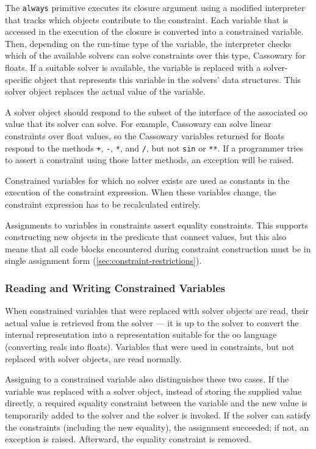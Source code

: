 The \lstinline{always} primitive executes its closure argument using a
modified interpreter that tracks which objects contribute to the
constraint. Each variable that is accessed in the execution of the
closure is converted into a constrained variable. Then, depending on
the run-time type of the variable, the interpreter checks which of the
available solvers can solve constraints over this type, \eg Cassowary
for floats. If a suitable solver is available, the variable is
replaced with a solver-specific object that represents this variable
in the solvers' data structures. This solver object replaces the
actual value of the variable.

A solver object should respond to the subset of the interface of the
associated \ac{oo} value that its solver can solve. For example,
Cassowary can solve linear constraints over float values, so the
Cassowary variables returned for floats respond to the methods
\lstinline{+}, \lstinline{-}, \lstinline{*}, and \lstinline{/}, but
not \lstinline{sin} or \lstinline{**}. If a programmer tries to assert
a constraint using those latter methods, an exception will be raised.

Constrained variables for which no solver exists are used as constants
in the execution of the constraint expression. When these variables
change, the constraint expression has to be recalculated entirely.

Assignments to variables in constraints assert equality
constraints. This supports constructing new objects in
the predicate that connect values, but this also means that all
code blocks encountered during constraint construction must be in
single assignment form (\autoref{sec:constraint-restrictions}).

\subsubsection{Reading and Writing Constrained Variables}
When constrained variables that were replaced with solver objects are
read, their actual value is retrieved from the solver --- it is up to
the solver to convert the internal representation into a
representation suitable for the \ac{oo} language (\eg converting
reals into floats). Variables that were used in constraints, but not
replaced with solver objects, are read normally.

Assigning to a constrained variable also distinguishes these two
cases. If the variable was replaced with a solver object, instead of
storing the supplied value directly, a required equality constraint
between the variable and the new value is temporarily added to the
solver and the solver is invoked.  If the solver can satisfy the
constraints (including the new equality), the assignment
succeeded; if not, an exception is raised.  Afterward, the equality
constraint is removed.


